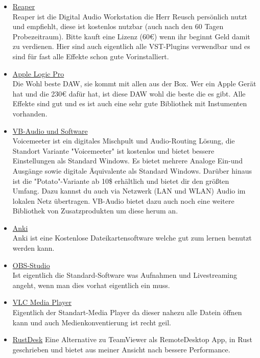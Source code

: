 \begin{itemize}
    \item \href{https://www.reaper.fm}{Reaper}\\
    Reaper ist die Digital Audio Workstation die Herr Reusch persönlich nutzt und empfiehlt, diese ist kostenlos nutzbar (auch nach den 60 Tagen Probezeitraum). Bitte kauft eine Lizenz (60€) wenn ihr beginnt Geld damit zu verdienen. Hier sind auch eigentlich alle VST-Plugins verwendbar und es sind für fast alle Effekte schon gute Vorinstalliert.
    \item \href{https://apps.apple.com/de/app/logic-pro/id634148309}{Apple Logic Pro}\\
    Die Wohl beste DAW, sie kommt mit allen aus der Box. Wer ein Apple Gerät hat und die 230€ dafür hat, ist diese DAW wohl die beste die es gibt. Alle Effekte sind gut und es ist auch eine sehr gute Bibliothek mit Instumenten vorhanden.
    \item \href{https://vb-audio.com/Voicemeeter/index.htm}{VB-Audio und Software}\\
    Voicemeeter ist ein digitales Mischpult und Audio-Routing Lösung, die Standort Variante "Voicemeeter" ist kostenlos und bietet bessere Einstellungen als Standard Windows. Es bietet mehrere Analoge Ein-und Ausgänge sowie digitale Äquivalente als Standard Windows. Darüber hinaus ist die "Potato"-Variante ab 10\$ erhältlich und bietet dir den größten Umfang. Dazu kannst du auch via Netzwerk (LAN und WLAN) Audio im lokalen Netz übertragen. VB-Audio bietet dazu auch noch eine weitere Bibliothek von Zusatzprodukten um diese herum an.
    \item \href{https://apps.ankiweb.net}{Anki}\\
    Anki ist eine Kostenlose Dateikartensoftware welche gut zum lernen benutzt werden kann.
    \item \href{https://obsproject.com/de/download}{OBS-Studio}\\
    Ist eigentlich die Standard-Software was Aufnahmen  und Livestreaming angeht, wenn man dies vorhat eigentlich ein muss.
    \item \href{https://www.videolan.org/vlc/index.de.html}{VLC Media Player}\\
    Eigentlich der Standart-Media Player da dieser nahezu alle Datein öffnen kann und auch Medienkonventierung ist recht geil.
    \item \href{https://rustdesk.com}{RustDesk}
    Eine Alternative zu TeamViewer als RemoteDesktop App, in Rust geschrieben und bietet aus meiner Ansicht nach bessere Performance.

\end{itemize}
